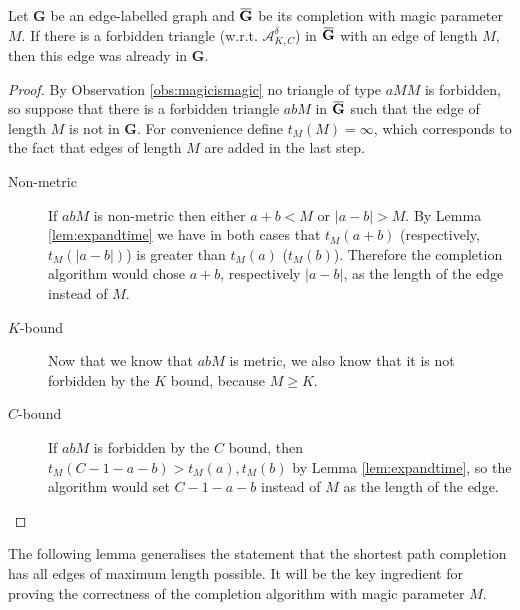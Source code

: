\documentclass[11pt]{amsart}
\newcommand{\overbar}[1]{\mkern 1.5mu\overline{\mkern-1.5mu#1\mkern-1.5mu}\mkern 1.5mu}
\def\str#1{\mathbf {#1}}
\begin{document}
\begin{lemma}\label{lem:misgood}
Let $\str{G}$ be an edge-labelled graph and $\overbar{\str{G}}$ be its completion with magic parameter $M$. If there is a forbidden triangle (w.r.t. $\mathcal A^\delta_{K,C}$) in $\overbar{\str{G}}$ with an edge of length $M$, then this edge was already in $\str{G}$.
\end{lemma}
\begin{proof}
By Observation \ref{obs:magicismagic} no triangle of type $aMM$ is forbidden, so suppose that there is a forbidden triangle $abM$ in $\overbar{\str{G}}$ such that the edge of length $M$ is not in $\str{G}$. For convenience define $t_M(M) = \infty$, which corresponds to the fact that edges of length $M$ are added in the last step.

\begin{description}
\item[Non-metric]
If $abM$ is non-metric then either $a+b<M$ or $|a-b|>M$. By Lemma \ref{lem:expandtime} we have in both cases that $t_M(a+b)$ (respectively, $t_M(|a-b|)$) is greater than $t_M(a)$ ($t_M(b)$). Therefore the completion algorithm would chose $a+b$, respectively $|a-b|$, as the length of the edge instead of $M$.

\item[$K$-bound]
Now that we know that $abM$ is metric, we also know that it is not forbidden by the $K$ bound, because $M\geq K$.

\item[$C$-bound]
If $abM$ is forbidden by the $C$ bound, then $t_M(C-1-a-b)>t_M(a),t_M(b)$ by Lemma \ref{lem:expandtime}, so the algorithm would set $C-1-a-b$ instead of $M$ as the length of the edge.
\end{description}
\end{proof}

The following lemma generalises the statement that the shortest path completion has all edges of maximum length possible. It will be the key ingredient for proving the correctness of the completion algorithm with magic parameter $M$.
\end{document}

